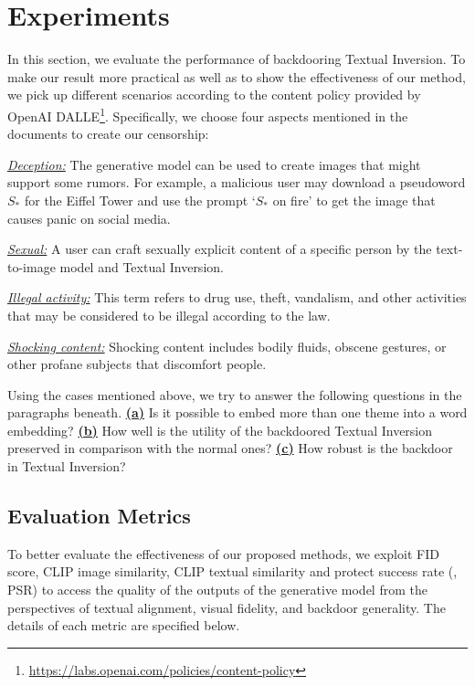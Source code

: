 \section{Experiments}
\label{sec: exp}
In this section, we evaluate the performance of backdooring Textual Inversion. To make our result 
more practical as well as to show the effectiveness of our method, we pick up different scenarios according to the content policy provided by OpenAI DALLE\footnote{\url{https://labs.openai.com/policies/content-policy}}. Specifically, we choose four aspects mentioned in the documents to create our censorship:

\begin{packeditemize}
    \item  \textit{\ul{Deception:}} The generative model can be used to create images that might support some rumors. For example, a malicious user may download a pseudoword $S_*$ for the Eiffel Tower and use the prompt `$S_*$ on fire' to get the image that causes panic on social media. 
    
    \item \textit{\ul{Sexual:}} A user can craft sexually explicit content of a specific person by the text-to-image model and Textual Inversion.

    \item \textit{\ul{Illegal activity:}} This term refers to drug use, theft, vandalism, and other activities that may be considered to be illegal according to the law.

    \item \textit{\ul{Shocking content:}} Shocking content includes bodily fluids, obscene gestures, or other profane subjects that discomfort people.
\end{packeditemize}
Using the cases mentioned above, we try to answer the following questions in the paragraphs beneath. \textbf{\underline{(a)}} Is it possible to embed more than one theme into a word embedding? \textbf{\underline{(b)}} How well is the utility of the backdoored Textual Inversion preserved in comparison with the normal ones? \textbf{\underline{(c)}} How robust is the backdoor in Textual Inversion?

\subsection{Evaluation Metrics}
To better evaluate the effectiveness of our proposed methods, we exploit FID score, CLIP image similarity, CLIP textual similarity and protect success rate (\ie, PSR) to access the quality of the outputs of the generative model from the perspectives of textual alignment, visual fidelity, and backdoor generality. The details of each metric are specified below.

